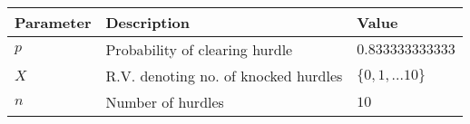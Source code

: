 \begin{tabular}{|l|l|l|}\hline
    Parameter	&Description	&Value\\ \hline
    $p$	&Probability of clearing hurdle	&$0.833333333333$\\ \hline
    $X$	&R.V. denoting no. of knocked hurdles	&$\{0, 1, ... 10\}$\\ \hline
    $n$	&Number of hurdles	&$10$\\ \hline
\end{tabular}
    
